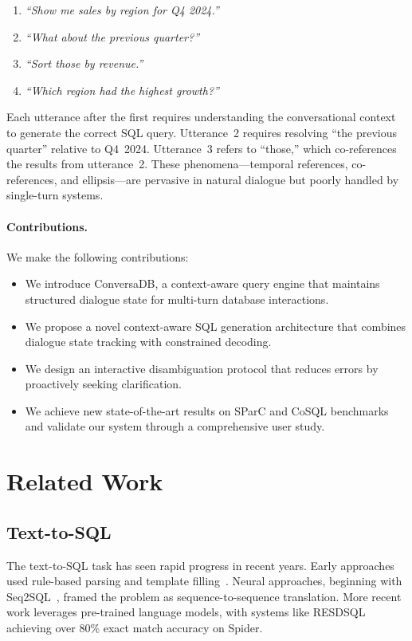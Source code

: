 \documentclass[sigconf,nonacm]{acmart}
\begin{document}
\begin{enumerate}
\item \textit{``Show me sales by region for Q4 2024.''}
\item \textit{``What about the previous quarter?''}
\item \textit{``Sort those by revenue.''}
\item \textit{``Which region had the highest growth?''}
\end{enumerate}

Each utterance after the first requires understanding the conversational context to generate the correct SQL query. Utterance~2 requires resolving ``the previous quarter'' relative to Q4~2024. Utterance~3 refers to ``those,'' which co-references the results from utterance~2. These phenomena---temporal references, co-references, and ellipsis---are pervasive in natural dialogue but poorly handled by single-turn systems.

\paragraph{Contributions.} We make the following contributions:

\begin{itemize}
\item We introduce ConversaDB, a context-aware query engine that maintains structured dialogue state for multi-turn database interactions.
\item We propose a novel context-aware SQL generation architecture that combines dialogue state tracking with constrained decoding.
\item We design an interactive disambiguation protocol that reduces errors by proactively seeking clarification.
\item We achieve new state-of-the-art results on SParC and CoSQL benchmarks and validate our system through a comprehensive user study.
\end{itemize}

\section{Related Work}

\subsection{Text-to-SQL}

The text-to-SQL task has seen rapid progress in recent years. Early approaches used rule-based parsing and template filling~\cite{li2014constructing}. Neural approaches, beginning with Seq2SQL~\cite{zhong2017seq2sql}, framed the problem as sequence-to-sequence translation. More recent work leverages pre-trained language models, with systems like RESDSQL~\cite{li2023resdsql} achieving over 80\% exact match accuracy on Spider.
\end{document}
